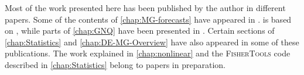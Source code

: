 Most of the work presented here has been published by the author in different papers. Some of the contents
of \cref{chap:MG-forecasts} have appeared in \cite{casas_linear_2017}.  is based
on \cite{casas_fitting_2016}, while parts of \cref{chap:GNQ} have been presented in \cite{casas_dynamics_2016-1}.
Certain sections of \cref{chap:Statistics} and \cref{chap:DE-MG-Overview} have also appeared in some of these publications.
The work explained in \cref{chap:nonlinear} and the \textsc{FisherTools} code described in \cref{chap:Statistics}
belong to papers in preparation.


%
%







 
